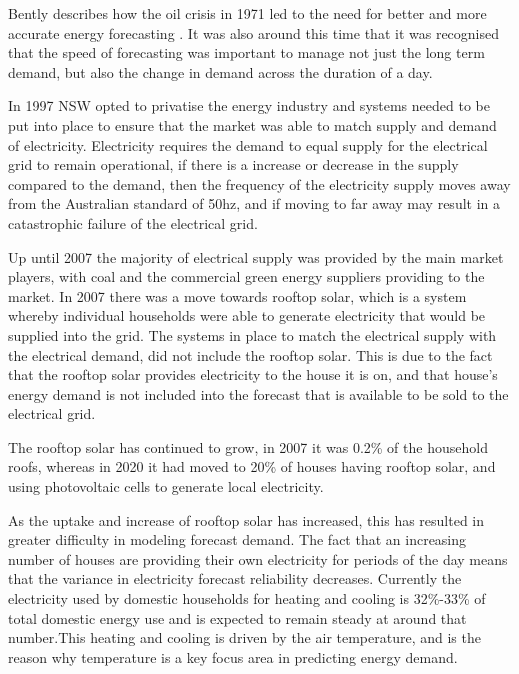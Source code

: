 \documentclass[mstat,12pt]{unswthesis}
\begin{document}
Bently describes how the oil crisis in 1971 led to the need for better
and more accurate energy forecasting \cite{bentley_2002_oil}. It was
also around this time that it was recognised that the speed of
forecasting was important to manage not just the long term demand, but
also the change in demand across the duration of a day.

In 1997 NSW opted to privatise the energy
industry\cite{smith_1997_electricity} and systems needed to be put into
place to ensure that the market was able to match supply and demand of
electricity. Electricity requires the demand to equal supply for the
electrical grid to remain operational, if there is a increase or
decrease in the supply compared to the demand, then the frequency of the
electricity supply moves away from the Australian standard of 50hz, and
if moving to far away may result in a catastrophic failure of the
electrical grid.

Up until 2007 the majority of electrical supply was provided by the main
market players, with coal and the commercial green energy suppliers
providing to the market. In 2007 there was a move towards rooftop solar,
which is a system whereby individual households were able to generate
electricity that would be supplied into the grid. The systems in place
to match the electrical supply with the electrical demand, did not
include the rooftop solar. This is due to the fact that the rooftop
solar provides electricity to the house it is on, and that house's
energy demand is not included into the forecast that is available to be
sold to the electrical grid.

The rooftop solar has continued to grow, in 2007 it was 0.2\% of the
household roofs, whereas in 2020 it had moved to 20\% of houses having
rooftop solar, and using photovoltaic cells to generate local
electricity\cite{aemo_2020_projections}.

As the uptake and increase of rooftop solar has increased, this has
resulted in greater difficulty in modeling forecast
demand\cite{parkinson_2019_rooftop}. The fact that an increasing number
of houses are providing their own electricity for periods of the day
means that the variance in electricity forecast reliability decreases.
Currently the electricity used by domestic households for heating and
cooling is 32\%-33\% of total domestic energy use and is expected to
remain steady at around that number\cite{rgevorsatz_2015_heating}.This
heating and cooling is driven by the air temperature, and is the reason
why temperature is a key focus area in predicting energy demand.
\end{document}
